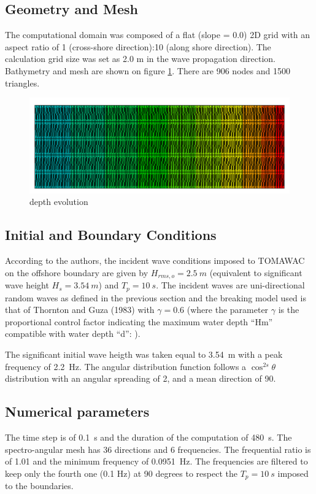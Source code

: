 \subsection{Geometry and Mesh}
%
The computational domain was composed of a flat (slope = 0.0) 2D grid with an aspect ratio of 1 (cross-shore direction):10 (along shore direction). The calculation grid size was set as 2.0 m in the wave propagation direction.
Bathymetry and mesh are shown on figure \ref{bathydean}. There are 906 nodes and 1500 triangles.
\begin{figure} [!h]
\centering
\includegraphics{bathy.png}
 \caption{depth evolution}
\label{bathydean}
\end{figure}

\subsection{Initial and Boundary Conditions}
%
According to the authors, the incident wave conditions imposed to TOMA\-WAC on the offshore boundary are given by $H_{rms,o} = 2.5~m$ (equivalent to significant wave height $H_s = 3.54~m$) and $T_p = 10~s$.
The incident waves are uni-directional random waves as defined in the previous section and the breaking model used is that of Thornton and Guza (1983) with  $\gamma=0.6$ (where the parameter $\gamma$  is the proportional control factor indicating the maximum water depth “Hm” compatible with water depth “d”: ).

The significant initial wave heigth was taken equal to 3.54~m with a peak frequency of 2.2~Hz. The angular distribution function follows a $\cos^{2s} \theta$ distribution with an angular spreading of 2, and a mean direction of 90.

\subsection{Numerical parameters}
%
The time step is of 0.1~s and the duration of the computation of 480~s. The spectro-angular mesh has 36 directions and 6 frequencies. The frequential ratio is of 1.01 and the minimum frequency of 0.0951~Hz. The frequencies are filtered to keep only the fourth one (0.1 Hz) at 90 degrees to respect the $T_p= 10~s$ imposed to the boundaries.

